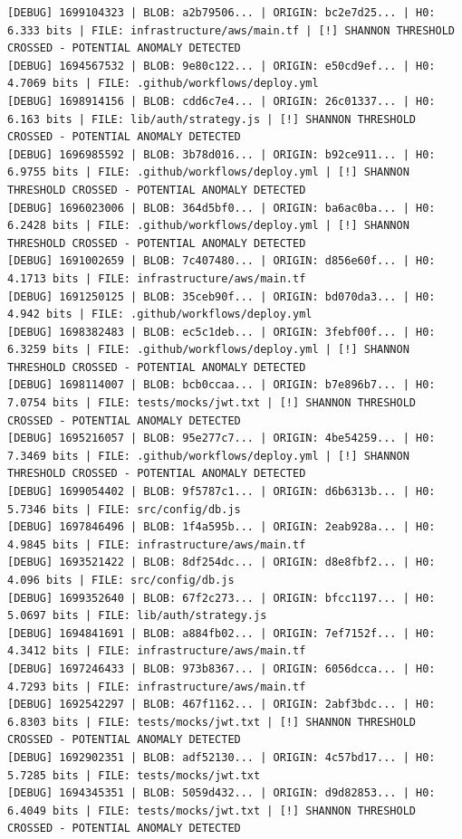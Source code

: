\documentclass[12pt, a4paper, oneside]{report}
\begin{document}
\begin{lstlisting}[basicstyle=\tiny\ttfamily]
[DEBUG] 1699104323 | BLOB: a2b79506... | ORIGIN: bc2e7d25... | H0: 6.333 bits | FILE: infrastructure/aws/main.tf | [!] SHANNON THRESHOLD CROSSED - POTENTIAL ANOMALY DETECTED
[DEBUG] 1694567532 | BLOB: 9e80c122... | ORIGIN: e50cd9ef... | H0: 4.7069 bits | FILE: .github/workflows/deploy.yml
[DEBUG] 1698914156 | BLOB: cdd6c7e4... | ORIGIN: 26c01337... | H0: 6.163 bits | FILE: lib/auth/strategy.js | [!] SHANNON THRESHOLD CROSSED - POTENTIAL ANOMALY DETECTED
[DEBUG] 1696985592 | BLOB: 3b78d016... | ORIGIN: b92ce911... | H0: 6.9755 bits | FILE: .github/workflows/deploy.yml | [!] SHANNON THRESHOLD CROSSED - POTENTIAL ANOMALY DETECTED
[DEBUG] 1696023006 | BLOB: 364d5bf0... | ORIGIN: ba6ac0ba... | H0: 6.2428 bits | FILE: .github/workflows/deploy.yml | [!] SHANNON THRESHOLD CROSSED - POTENTIAL ANOMALY DETECTED
[DEBUG] 1691002659 | BLOB: 7c407480... | ORIGIN: d856e60f... | H0: 4.1713 bits | FILE: infrastructure/aws/main.tf
[DEBUG] 1691250125 | BLOB: 35ceb90f... | ORIGIN: bd070da3... | H0: 4.942 bits | FILE: .github/workflows/deploy.yml
[DEBUG] 1698382483 | BLOB: ec5c1deb... | ORIGIN: 3febf00f... | H0: 6.3259 bits | FILE: .github/workflows/deploy.yml | [!] SHANNON THRESHOLD CROSSED - POTENTIAL ANOMALY DETECTED
[DEBUG] 1698114007 | BLOB: bcb0ccaa... | ORIGIN: b7e896b7... | H0: 7.0754 bits | FILE: tests/mocks/jwt.txt | [!] SHANNON THRESHOLD CROSSED - POTENTIAL ANOMALY DETECTED
[DEBUG] 1695216057 | BLOB: 95e277c7... | ORIGIN: 4be54259... | H0: 7.3469 bits | FILE: .github/workflows/deploy.yml | [!] SHANNON THRESHOLD CROSSED - POTENTIAL ANOMALY DETECTED
[DEBUG] 1699054402 | BLOB: 9f5787c1... | ORIGIN: d6b6313b... | H0: 5.7346 bits | FILE: src/config/db.js
[DEBUG] 1697846496 | BLOB: 1f4a595b... | ORIGIN: 2eab928a... | H0: 4.9845 bits | FILE: infrastructure/aws/main.tf
[DEBUG] 1693521422 | BLOB: 8df254dc... | ORIGIN: d8e8fbf2... | H0: 4.096 bits | FILE: src/config/db.js
[DEBUG] 1699352640 | BLOB: 67f2c273... | ORIGIN: bfcc1197... | H0: 5.0697 bits | FILE: lib/auth/strategy.js
[DEBUG] 1694841691 | BLOB: a884fb02... | ORIGIN: 7ef7152f... | H0: 4.3412 bits | FILE: infrastructure/aws/main.tf
[DEBUG] 1697246433 | BLOB: 973b8367... | ORIGIN: 6056dcca... | H0: 4.7293 bits | FILE: infrastructure/aws/main.tf
[DEBUG] 1692542297 | BLOB: 467f1162... | ORIGIN: 2abf3bdc... | H0: 6.8303 bits | FILE: tests/mocks/jwt.txt | [!] SHANNON THRESHOLD CROSSED - POTENTIAL ANOMALY DETECTED
[DEBUG] 1692902351 | BLOB: adf52130... | ORIGIN: 4c57bd17... | H0: 5.7285 bits | FILE: tests/mocks/jwt.txt
[DEBUG] 1694345351 | BLOB: 5059d432... | ORIGIN: d9d82853... | H0: 6.4049 bits | FILE: tests/mocks/jwt.txt | [!] SHANNON THRESHOLD CROSSED - POTENTIAL ANOMALY DETECTED

\end{lstlisting}
\end{document}
